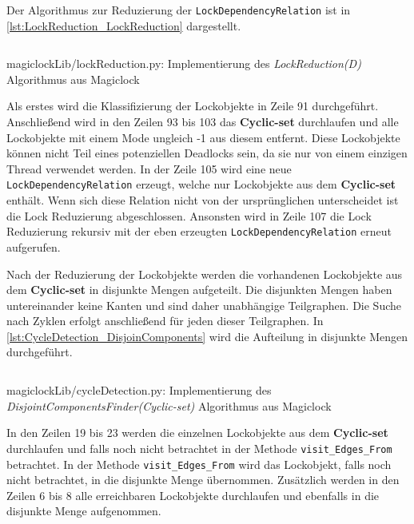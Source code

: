 Der Algorithmus zur Reduzierung der \texttt{LockDependencyRelation} ist in
\cref{lst:LockReduction_LockReduction} dargestellt.
\begin{listing}[ht]
  \inputminted[frame=lines,linenos,firstline=90]{python}{./Python/magiclockLib/lockReduction.py}
  \caption{magiclockLib/lockReduction.py: Implementierung des \emph{LockReduction(D)} Algorithmus aus Magiclock\autocite[5]{MagicLock}}
  \label{lst:LockReduction_LockReduction}
\end{listing}
Als erstes wird die Klassifizierung der Lockobjekte in Zeile 91 durchgeführt.
Anschließend wird in den Zeilen 93 bis 103 das \textbf{Cyclic-set} durchlaufen
und alle Lockobjekte mit einem Mode ungleich -1 aus diesem entfernt. Diese
Lockobjekte können nicht Teil eines potenziellen Deadlocks sein, da sie nur von
einem einzigen Thread verwendet werden. In der Zeile 105 wird eine neue
\texttt{LockDependencyRelation} erzeugt, welche nur Lockobjekte aus dem
\textbf{Cyclic-set} enthält. Wenn sich diese Relation nicht von der
ursprünglichen unterscheidet ist die Lock Reduzierung abgeschlossen. Ansonsten
wird in Zeile 107 die Lock Reduzierung rekursiv mit der eben erzeugten
\texttt{LockDependencyRelation} erneut aufgerufen.

Nach der Reduzierung der Lockobjekte werden die vorhandenen Lockobjekte aus dem
\textbf{Cyclic-set} in disjunkte Mengen aufgeteilt. Die disjunkten Mengen haben
untereinander keine Kanten und sind daher unabhängige Teilgraphen. Die Suche
nach Zyklen erfolgt anschließend für jeden dieser Teilgraphen. In
\cref{lst:CycleDetection_DisjoinComponents} wird die Aufteilung in disjunkte
Mengen durchgeführt. 
\begin{listing}[ht]
  \inputminted[frame=lines,linenos,firstline=1,lastline=25]{python}{./Python/magiclockLib/cycleDetection.py}
  \caption{magiclockLib/cycleDetection.py: Implementierung des \emph{DisjointComponentsFinder(Cyclic-set)} Algorithmus aus Magiclock\autocite[8]{MagicLock}}
  \label{lst:CycleDetection_DisjoinComponents}
\end{listing}
In den Zeilen 19 bis 23 werden die einzelnen Lockobjekte aus dem
\textbf{Cyclic-set} durchlaufen und falls noch nicht betrachtet in der Methode
\texttt{visit\_Edges\_From} betrachtet. In der Methode \texttt{visit\_Edges\_From}
wird das Lockobjekt, falls noch nicht betrachtet, in die disjunkte Menge
übernommen. Zusätzlich werden in den Zeilen 6 bis 8 alle erreichbaren
Lockobjekte durchlaufen und ebenfalls in die disjunkte Menge aufgenommen.


